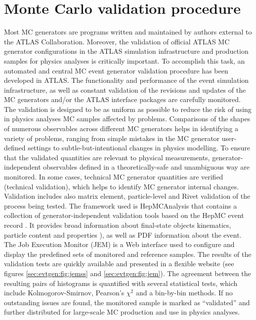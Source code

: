 \section{Monte Carlo validation procedure}
\label{chp:evtsim:valid}


Most MC generators are programs written and maintained by authors external to the ATLAS Collaboration. Moreover, the validation of official ATLAS MC generator configurations in the ATLAS simulation infrastructure and production samples for physics analyses is critically important. To accomplish this task, an automated and central MC event generator validation procedure has been developed in ATLAS. The functionality and performance of the event simulation infrastructure, as well as constant validation of the revisions and updates of the MC generators and/or the ATLAS interface packages are carefully monitored. The validation is designed to be as uniform as possible to reduce the risk of using in physics analyses MC samples affected by problems. Comparisons  of the shapes of numerous observables across different MC generators helps in identifying a variety of problems, ranging from simple mistakes in the MC generator user-defined settings to subtle-but-intentional changes in physics modelling. To ensure that the validated quantities are relevant to physical measurements, generator-independent observables defined in a theoretically-safe and unambiguous way are monitored. In some cases, technical MC generator quantities are verified (technical validation), which helps to identify MC generator internal changes. Validation includes also matrix element, particle-level and Rivet \cite{Buckley:2010ar} validation of the process being tested. The framework used is HepMCAnalysis \cite{hepmcanalysis} that contains a collection of generator-independent validation tools based on the HepMC event record \cite{Dobbs:2001ck}. It provides  broad information about final-state objects kinematics, particle content and properties ), as well as PDF information about the event. The Job Execution Monitor (JEM) \cite{Ehses:2008zz} is a Web interface used to configure and display the predefined sets of monitored and reference samples. The results of the validation tests are quickly available and presented in a flexible website (see figures \ref{sec:evtgen:fig:jemss} and \ref{sec:evtgen:fig:jem}). The agreement between the resulting pairs of histograms is quantified with several statistical tests, which include Kolmogorov-Smirnov, Pearson's $\chi^{2}$ and a bin-by-bin methods. If no outstanding issues are found, the monitored sample is marked as ``validated'' and further distributed for large-scale MC production and use in physics analyses.


